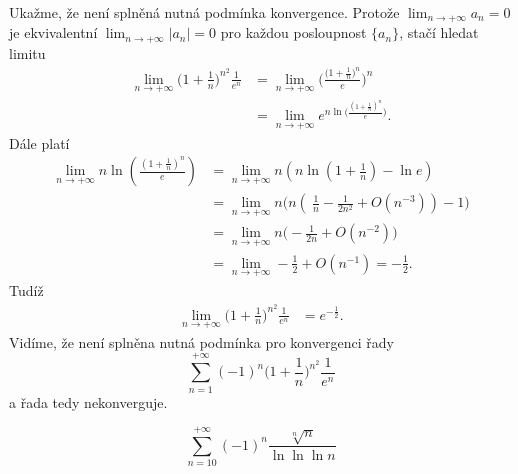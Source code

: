 \documentclass[answers]{exam}
\begin{document}
\begin{questions}
  \begin{solution}
  	Ukažme, že není splněná nutná podmínka konvergence. Protože $\lim_{n \to+ \infty} a_n = 0$ je ekvivalentní $\lim_{n \to+ \infty} |a_n| = 0$ pro každou posloupnost $\{ a_n \}$, stačí hledat limitu
		\begin{align*}
		\lim_{n\to+\infty}\bigg(1+\frac{1}{n}\bigg)^{n^2}\frac{1}{e^n}&=\lim_{n\to+\infty}\bigg(\frac{\big(1+\frac{1}{n}\big)^n}{e}\bigg)^{n}\\
		&=\lim_{n\to+\infty}e^{n \ln \big(\frac{(1+\frac{1}{n})^n}{e}\big)}. 
		\end{align*}
		D\'ale platí
		\begin{align*}
		\lim_{n\to+\infty}{n \ln \left(\frac{(1+\frac{1}{n})^n}{e}\right)}&=\lim_{n\to+\infty}n\left(n\ln\left(1+\frac{1}{n}\right)-\ln e\right)\\
		&=\lim_{n\to+\infty}n\bigg(n\left(\ \frac{1}{n}-\frac{1}{2n^2}+O(n^{-3})\right)-1\bigg)\\
		&=\lim_{n\to+\infty}n\bigg(-\frac{1}{2n}+O(n^{-2})\bigg)\\
		&=\lim_{n\to+\infty}-\frac{1}{2}+O(n^{-1})=-\frac{1}{2}.
		\end{align*}
		Tud\'i\v z 
		\begin{align*}
		\lim_{n\to+\infty}\bigg(1+\frac{1}{n}\bigg)^{n^2}\frac{1}{e^n}&=e^{-\frac{1}{2}}.
		\end{align*}
		Vid\'ime, \v ze nen\'i spln\v ena nutn\'a podm\'inka pro konvergenci \v rady
		$$\sum_{n=1}^{+\infty}(-1)^n\bigg(1+\frac{1}{n}\bigg)^{n^2}\frac{1}{e^n}$$
		a \v rada tedy nekonverguje.
  \end{solution}

  \question
  \begin{equation*}
    \sum_{n = 10}^{+\infty}
		\left( -1 \right)^n
		\frac{\sqrt[n]{n}}{\ln \ln \ln n}
  \end{equation*}
  

\end{questions}
\end{document}
